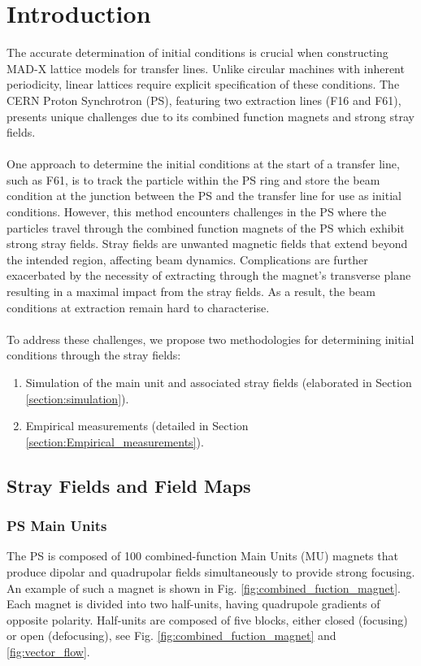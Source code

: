\section{Introduction}

The accurate determination of initial conditions is crucial when constructing MAD-X lattice models for transfer lines. Unlike circular machines with inherent periodicity, linear lattices require explicit specification of these conditions. The CERN Proton Synchrotron (PS), featuring two extraction lines (F16 and F61), presents unique challenges due to its combined function magnets and strong stray fields.
\\
\\
One approach to determine the initial conditions at the start of a transfer line, such as F61, is to track the particle within the PS ring and store the beam condition at the junction between the PS and the transfer line for use as initial conditions. However, this method encounters challenges in the PS where the particles travel through the combined function magnets of the PS which exhibit strong stray fields. Stray fields are unwanted magnetic fields that extend beyond the intended region, affecting beam dynamics. Complications are further exacerbated by the necessity of extracting through the magnet's transverse plane resulting in a maximal impact from the stray fields. As a result, the beam conditions at extraction remain hard to characterise.
\\
\\
To address these challenges, we propose two methodologies for determining initial conditions through the stray fields:
\begin{enumerate}
    \item{Simulation of the main unit and associated stray fields (elaborated in Section \ref{section:simulation}).}
    \item{Empirical measurements (detailed in Section \ref{section:Empirical_measurements}).}
\end{enumerate}


\subsection{Stray Fields and Field Maps}
\subsubsection{PS Main Units}

The PS is composed of 100 combined-function Main Units (MU) magnets that produce dipolar and quadrupolar fields simultaneously to provide strong focusing. An example of such a magnet is shown in Fig. \ref{fig:combined_fuction_magnet}. Each magnet is divided into two half-units, having quadrupole gradients of opposite polarity. Half-units are composed of five blocks, either closed (focusing) or open (defocusing), see Fig. \ref{fig:combined_fuction_magnet} and \ref{fig:vector_flow}.
\\

